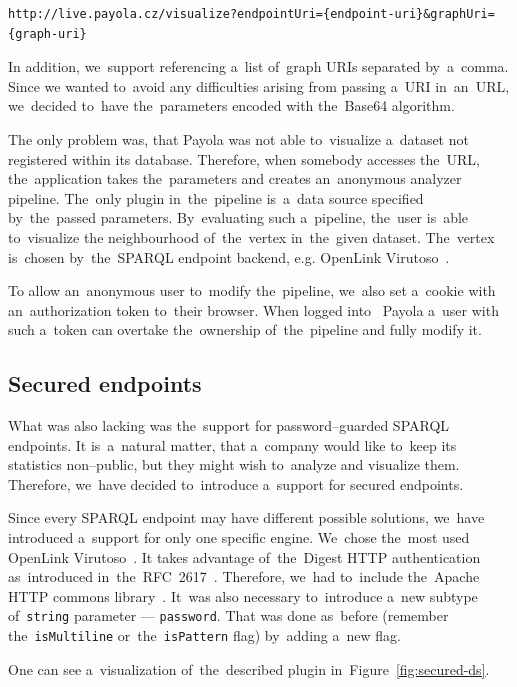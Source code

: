 {  \scriptsize
\begin{verbatim}
http://live.payola.cz/visualize?endpointUri={endpoint-uri}&graphUri={graph-uri}
\end{verbatim}
}

In addition, we~support referencing a~list of~graph URIs separated by~a~comma. Since 
we wanted to~avoid any difficulties arising from passing a~URI in~an~URL, we~decided to~have the~parameters encoded with the~Base64 algorithm.

The only problem was, that Payola was not able to~visualize a~dataset not registered
within its database. Therefore, when somebody accesses the~URL, the~application takes the~parameters and creates an~anonymous analyzer 
pipeline. The~only plugin in~the~pipeline is~a~data source specified by~the~passed parameters. By~evaluating such a~pipeline, the~user is~able to~visualize 
the neighbourhood of~the~vertex in~the~given dataset. The~vertex is~chosen by~the~SPARQL endpoint backend, e.g. OpenLink Virutoso~\cite{virtuoso}.

To allow an~anonymous user to~modify the~pipeline, we~also set a~cookie with an~authorization token to~their browser. When logged into~ 
Payola a~user with such a~token can overtake the~ownership of~the~pipeline and 
fully modify it.

\subsection{Secured endpoints}
What was also lacking was the~support for password--guarded SPARQL endpoints. 
It is~a~natural matter, that a~company would like to~keep its statistics 
non--public, but they might wish to~analyze and visualize them. Therefore, we~have decided to~introduce a~support for secured endpoints.

Since every SPARQL endpoint may have different possible solutions, we~have 
introduced a~support for only one specific engine. We~chose the~most
used OpenLink Virutoso~\cite{virtuoso}.
It takes advantage of~the~Digest HTTP authentication as~introduced in~the~RFC~2617~\cite{rfc-2617}. Therefore, we~had to~include the~Apache HTTP commons 
library~\cite{apache-http-commons}. It~was also necessary to~introduce a~new 
subtype of~\texttt{string} parameter --- \texttt{password}. That was done as~before (remember the~\texttt{isMultiline} or~the~\texttt{isPattern} flag) by~adding a~new flag.

One can see a~visualization of~the~described plugin in~Figure~\ref{fig:secured-ds}. 

